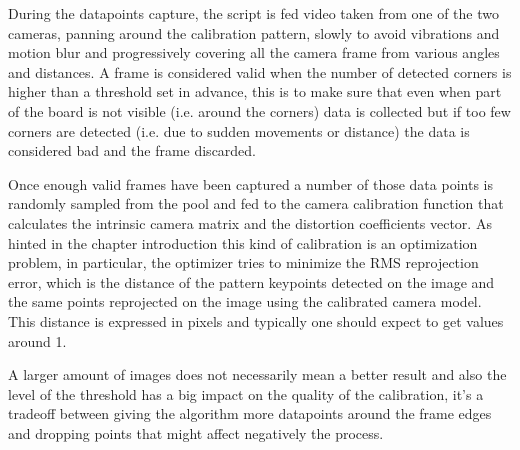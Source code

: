 During the datapoints capture, the script is fed video taken from one of the two cameras, panning around the calibration pattern, slowly to avoid vibrations and motion blur and progressively covering all the camera frame from various angles and distances. A frame is considered valid when the number of detected corners is higher than a threshold set in advance, this is to make sure that even when part of the board is not visible (i.e. around the corners) data is collected but if too few corners are detected (i.e. due to sudden movements or distance) the data is considered bad and the frame discarded.

Once enough valid frames have been captured a number of those data points is randomly sampled from the pool and fed to the camera calibration function that calculates the intrinsic camera matrix and the distortion coefficients vector. As hinted in the chapter introduction this kind of calibration is an optimization problem, in particular, the optimizer tries to minimize the RMS reprojection error, which is the distance of the pattern keypoints detected on the image and the same points reprojected on the image using the calibrated camera model. This distance is expressed in pixels and typically one should expect to get values around 1.

A larger amount of images does not necessarily mean a better result and also the level of the threshold has a big impact on the quality of the calibration, it's a tradeoff between giving the algorithm more datapoints around the frame edges and dropping points that might affect negatively the process.

